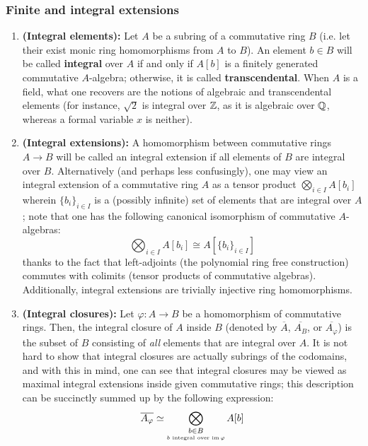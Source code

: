             \subsubsection{Finite and integral extensions}
                \begin{definition} \label{def: integral_extensions}  
                    \noindent
                    \begin{enumerate}
                        \item \textbf{(Integral elements):} Let $A$ be a subring of a commutative ring $B$ (i.e. let their exist monic ring homomorphisms from $A$ to $B$). An element $b \in B$ will be called \textbf{integral} over $A$ if and only if $A[b]$ is a finitely generated commutative $A$-algebra; otherwise, it is called \textbf{transcendental}. When $A$ is a field, what one recovers are the notions of algebraic and transcendental elements (for instance, $\sqrt{2}$ is integral over $\mathbb{Z}$, as it is algebraic over $\mathbb{Q}$, whereas a formal variable $x$ is neither). 
                        \item \textbf{(Integral extensions):} A homomorphism between commutative rings $A \to B$ will be called an integral extension if all elements of $B$ are integral over $B$. Alternatively (and perhaps less confusingly), one may view an integral extension of a commutative ring $A$ as a tensor product $\bigotimes_{i \in I} A[b_i]$ wherein $\{b_i\}_{i \in I}$ is a (possibly infinite) set of elements that are integral over $A$; note that one has the following canonical isomorphism of commutative $A$-algebras:
                            $$\bigotimes_{i \in I} A[b_i] \cong A\left[\{b_i\}_{i \in I}\right]$$
                        thanks to the fact that left-adjoints (the polynomial ring free construction) commutes with colimits (tensor products of commutative algebras). Additionally, integral extensions are trivially injective ring homomorphisms.
                        \item \textbf{(Integral closures):} Let $\varphi: A \to B$ be a homomorphism of commutative rings. Then, the integral closure of $A$ inside $B$ (denoted by $\overline{A}$, $\overline{A_B}$, or $\overline{A_{\varphi}}$) is the subset of $B$ consisting of \textit{all} elements that are integral over $A$. It is not hard to show that integral closures are actually subrings of the codomains, and with this in mind, one can see that integral closures may be viewed as maximal integral extensions inside given commutative rings; this description can be succinctly summed up by the following expression:
                            $$\overline{A_{\varphi}} \simeq \bigotimes_{\underset{\text{$b$ integral over $\operatorname{im} \varphi$}}{b \in B}} A[b]$$
                    \end{enumerate}
                \end{definition}

